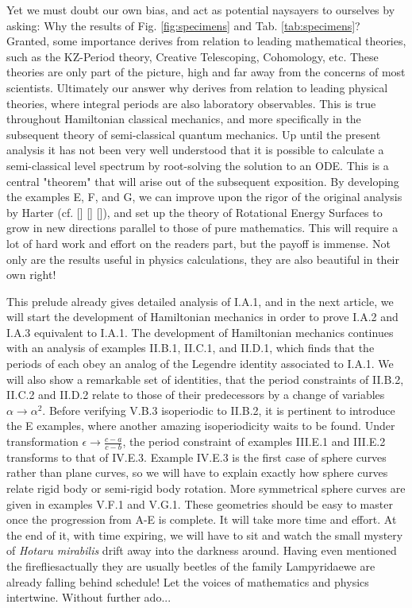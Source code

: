 \documentclass[nofootinbib,preprint]{revtex4-1}
\begin{document}
Yet we must doubt our own bias, and act as potential naysayers to ourselves by 
asking: Why the results of Fig. \ref{fig:specimens} and Tab. \ref{tab:specimens}? Granted, some 
importance derives from relation to leading mathematical theories, such as the KZ-Period theory, 
Creative Telescoping, Cohomology, etc. These theories are only part of the picture, high and far
away from the concerns of most scientists. Ultimately our answer why derives from relation to 
leading physical theories, where integral periods are also laboratory observables. This is true 
throughout Hamiltonian classical mechanics, and more specifically in the subsequent theory
of semi-classical quantum mechanics. Up until the present analysis it has not been very well
understood that it is possible to calculate a semi-classical level spectrum by root-solving the
solution to an ODE. This is a central "theorem" that will arise out of the subsequent exposition. 
By developing the examples E, F, and G, we can improve upon the rigor of the original analysis 
by Harter (cf. [] [] []), and set up the theory of Rotational Energy Surfaces to grow in 
new directions parallel to those of pure mathematics. This will require a lot of hard work 
and effort on the readers part, but the payoff is immense. Not only are the results useful
in physics calculations, they are also beautiful in their own right!

This prelude already gives detailed analysis of I.A.1, and in the next article, we will start 
the development of Hamiltonian mechanics in order to prove I.A.2 and I.A.3 equivalent to I.A.1. 
The development of Hamiltonian mechanics continues with an analysis of examples II.B.1, II.C.1, 
and II.D.1, which finds that the periods of each obey an analog of the Legendre identity associated
to I.A.1. We will also show a remarkable set of identities, that the period constraints of II.B.2, 
II.C.2 and II.D.2 relate to those of their predecessors by a change of variables 
$\alpha \rightarrow \alpha^2$. Before verifying V.B.3 isoperiodic to II.B.2, it is pertinent to
introduce the E examples, where another amazing isoperiodicity waits to be found. Under transformation 
$\epsilon \rightarrow \frac{c-a}{c-b}$, the period constraint of examples III.E.1 and III.E.2 transforms 
to that of IV.E.3. Example IV.E.3 is the first case of sphere curves rather than plane curves, so 
we will have to explain exactly how sphere curves relate rigid body or semi-rigid body rotation. More 
symmetrical sphere curves are given in examples V.F.1 and V.G.1. These geometries should 
be easy to master once the progression from A-E is complete. It will take more time and 
effort. At the end of it, with time expiring, we will have to sit and watch the small mystery of 
\textit{Hotaru mirabilis} drift away into the darkness around. Having even mentioned the 
fireflies\textemdash actually they are usually beetles of the family Lampyridae\textemdash we 
are already falling behind schedule! Let the voices of mathematics and physics intertwine. 
Without further ado... 

  


\end{document}
